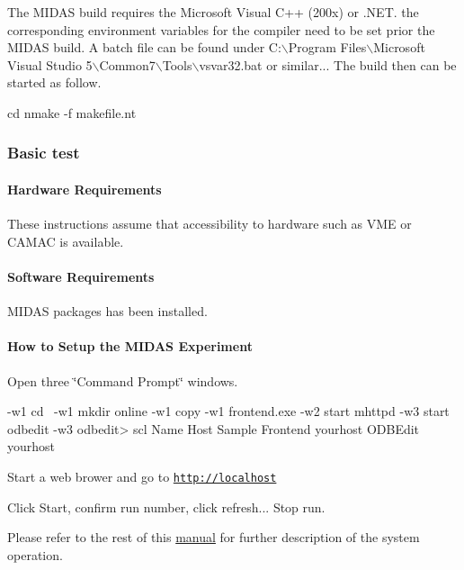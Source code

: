 \begin{DoxyItemize}
\item The MIDAS build requires the Microsoft Visual C++ (200x) or .NET. the corresponding environment variables for the compiler need to be set prior the MIDAS build. A batch file can be found under C:$\backslash$Program Files$\backslash$Microsoft Visual Studio 5$\backslash$Common7$\backslash$Tools$\backslash$vsvar32.bat or similar... The build then can be started as follow. 
\begin{DoxyCode}
  cd %
  nmake -f makefile.nt
\end{DoxyCode}
 \par

\end{DoxyItemize}



 \hypertarget{Q_Windows_Q_Windows_Basic_Test}{}\subsubsection{Basic test}\label{Q_Windows_Q_Windows_Basic_Test}
\hypertarget{Q_Windows_Q_Windows_Hardware_Requirements}{}\paragraph{Hardware Requirements}\label{Q_Windows_Q_Windows_Hardware_Requirements}
These instructions assume that accessibility to hardware such as VME or CAMAC is available.\hypertarget{Q_Windows_Q_Windows_Software_Requirements}{}\paragraph{Software Requirements}\label{Q_Windows_Q_Windows_Software_Requirements}
MIDAS packages has been installed.\hypertarget{Q_Windows_Q_Windows_Expt_Setup}{}\paragraph{How to Setup the MIDAS Experiment}\label{Q_Windows_Q_Windows_Expt_Setup}

\begin{DoxyItemize}
\item Open three \char`\"{}Command Prompt\char`\"{} windows. 
\begin{DoxyCode}
  -w1 cd \
  -w1 mkdir online
  -w1 copy %
  -w1 frontend.exe
  -w2 start mhttpd 
  -w3 start odbedit
  -w3 odbedit> scl
      Name                Host
      Sample Frontend     yourhost
      ODBEdit             yourhost
\end{DoxyCode}

\item Start a web brower and go to \href{http://localhost}{\tt http://localhost}
\item Click Start, confirm run number, click refresh... Stop run.
\end{DoxyItemize}


\begin{DoxyItemize}
\item Please refer to the rest of this \hyperlink{Organization}{manual} for further description of the system operation. \par
 \label{index_end}
\hypertarget{index_end}{}

\end{DoxyItemize}

\par
  \par
 